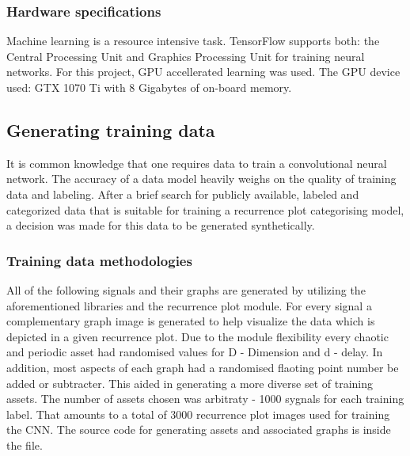 \documentclass[a4paper,12pt,fleqn]{article}
\begin{document}
\subsubsection{Hardware specifications}
\label{sec:hardware}
Machine learning is a resource intensive task.
TensorFlow supports both: the Central Processing Unit and Graphics Processing Unit for training neural networks.
For this project, GPU accellerated learning was used.
The GPU device used: GTX 1070 Ti with 8 Gigabytes of on-board memory.


\subsection{Generating training data}
It is common knowledge that one requires data to train a convolutional neural network.
The accuracy of a data model heavily weighs on the quality of training data and labeling.
After a brief search for publicly available, labeled and categorized data that is suitable for training a recurrence plot categorising model, a decision was made for this data to be generated synthetically.


\subsubsection{Training data methodologies}
All of the following signals and their graphs are generated by utilizing
the aforementioned libraries and the recurrence plot module.
For every signal a complementary graph image is generated to help visualize the data which is depicted in a given recurrence plot.
Due to the module flexibility every chaotic and periodic asset had randomised values for D - Dimension and d - delay.
In addition, most aspects of each graph had a randomised flaoting point number be added or subtracter.
This aided in generating a more diverse set of training assets.
The number of assets chosen was arbitraty - 1000 sygnals for each training label.
That amounts to a total of 3000 recurrence plot images used for training the CNN.
The source code for generating assets and associated graphs is inside the  file.


\end{document}
